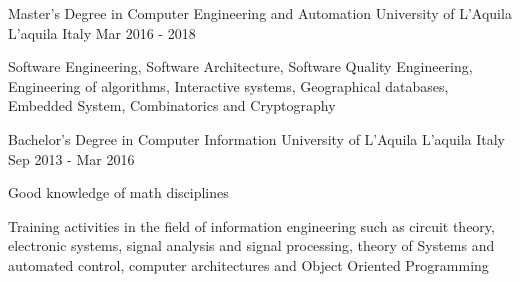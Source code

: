 


\begin{cventries}

\cventry
{Master’s Degree in Computer Engineering and Automation} %
{University of L'Aquila} %
{L'aquila Italy} %
{Mar 2016 - 2018} %
{ %
	\begin{cvitems}
		\item {Software Engineering, Software Architecture, Software Quality Engineering, Engineering of algorithms, 
			Interactive systems, Geographical databases, Embedded System, Combinatorics and Cryptography }
	\end{cvitems}
}

\cventry
{Bachelor’s Degree in Computer Information} %
{University of L'Aquila} %
{L'aquila Italy} %
{Sep 2013 - Mar 2016} %
{ %
\begin{cvitems}
\item {Good knowledge of math disciplines}
\item {Training activities in the field of information engineering such as circuit theory, electronic systems, signal analysis and signal processing, theory of
	Systems and automated control, computer architectures and Object Oriented Programming}
\end{cvitems}
}

\end{cventries}